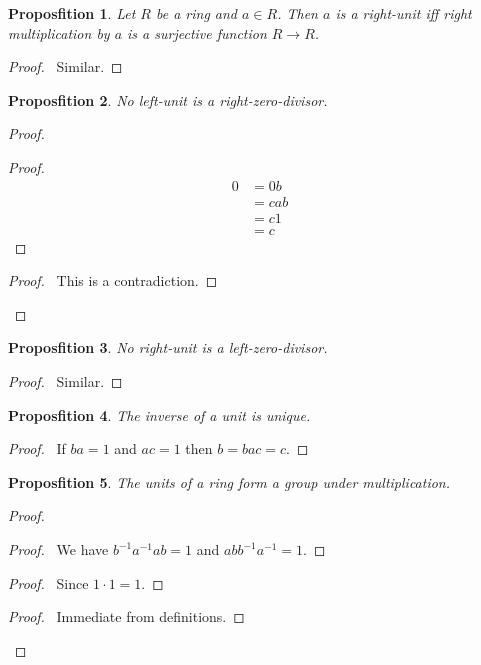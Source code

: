 \documentclass{book}
\let\qed\relax
\newtheorem{prop}{Proposfition}[chapter]
\theoremstyle{definition}
\newcommand{\inv}[1]{\ensuremath{{#1}^{-1}}}
\begin{document}
\begin{prop}
Let $R$ be a ring and $a \in R$. Then $a$ is a right-unit iff right multiplication by $a$ is a surjective function $R \rightarrow R$.
\end{prop}

\begin{proof}
\pf\ Similar. \qed
\end{proof}

\begin{prop}
\label{prop:no-left-unit-is-a-right-zero-divisor}
No left-unit is a right-zero-divisor.
\end{prop}

\begin{proof}
\pf
{}
\begin{proof}
	\pf
	\begin{align*}
		0 & = 0b \\
		& = cab \\
		& = c1 \\
		& = c
	\end{align*}
\end{proof}
\qedstep
\begin{proof}
	\pf\ This is a contradiction.
\end{proof}
\qed
\end{proof}

\begin{prop}
\label{prop:no-right-unit-is-a-left-zero-divisor}
No right-unit is a left-zero-divisor.
\end{prop}

\begin{proof}
\pf\ Similar. \qed
\end{proof}

\begin{prop}
The inverse of a unit is unique.
\end{prop}

\begin{proof}
\pf\ If $ba = 1$ and $ac = 1$ then $b = bac = c$. \qed
\end{proof}

\begin{prop}
The units of a ring form a group under multiplication.
\end{prop}

\begin{proof}
\pf
{}
\begin{proof}
	\pf\ We have $\inv{b} \inv{a} a b = 1$ and $ab \inv{b} \inv{a} = 1$.
\end{proof}
\begin{proof}
	\pf\ Since $1 \cdot 1 = 1$.
\end{proof}
\begin{proof}
	\pf\ Immediate from definitions.
\end{proof}
\qed
\end{proof}
\end{document}
